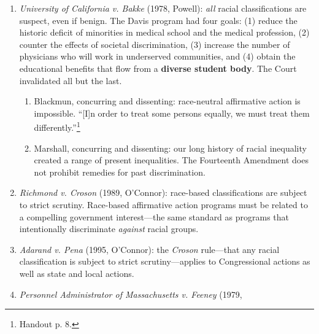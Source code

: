 \begin{enumerate}
    \begin{enumerate}
        \item Stewart, concurring: racial awareness is not unconstitutional 
        per se. If there is no disparate impact (\emph{Davis}) and no 
        discriminatory intent, there is no constitutional violation.
        \item Brennan, concurring: benign racial classifications can have 
        invidious results---for instance, they can ``serve to stimulate our 
        society's latent race consciousness.''\footnote{Handout p. 3.}
    \end{enumerate}
    \item \emph{University of California v. Bakke} (1978, Powell): \emph{all} 
    racial classifications are suspect, even if benign. The Davis program had 
    four goals: (1) reduce the historic deficit of minorities in medical 
    school and the medical profession, (2) counter the effects of societal 
    discrimination, (3) increase the number of physicians who will work in 
    underserved communities, and (4) obtain the educational benefits that flow 
    from a \textbf{diverse student body}. The Court invalidated all but the 
    last.
    \begin{enumerate}
        \item Blackmun, concurring and dissenting: race-neutral affirmative 
        action is impossible. ``[I]n order to treat some persons equally, we 
        must treat them differently.''\footnote{Handout p. 8.}
        \item Marshall, concurring and dissenting: our long history of racial 
        inequality created a range of present inequalities. The Fourteenth 
        Amendment does not prohibit remedies for past discrimination.
    \end{enumerate}
    \item \emph{Richmond v. Croson} (1989, O'Connor): race-based 
    classifications are subject to strict scrutiny.  Race-based affirmative 
    action programs must be related to a compelling government interest---the 
    same standard as programs that intentionally discriminate \emph{against} 
    racial groups.
    \item \emph{Adarand v. Pena} (1995, O'Connor): the \emph{Croson} 
    rule---that any racial classification is subject to strict 
    scrutiny---applies to Congressional actions as well as state and local 
    actions. 
    \item \emph{Personnel Administrator of Massachusetts v. Feeney} (1979, 

\end{enumerate}
